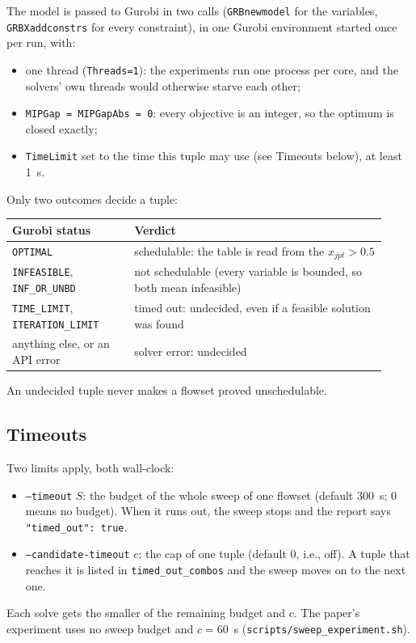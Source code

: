 \documentclass[11pt]{article}
\begin{document}
The model is passed to Gurobi in two calls (\texttt{GRBnewmodel} for the
variables, \texttt{GRBXaddconstrs} for every constraint), in one Gurobi
environment started once per run, with:
\begin{itemize}
    \item one thread (\texttt{Threads=1}): the experiments run one process per
          core, and the solvers' own threads would otherwise starve each
          other;
    \item \texttt{MIPGap = MIPGapAbs = 0}: every objective is an integer, so
          the optimum is closed exactly;
    \item \texttt{TimeLimit} set to the time this tuple may use (see
          Timeouts below), at least 1~s.
\end{itemize}
Only two outcomes decide a tuple:
\begin{center}
\begin{tabular}{p{0.3\linewidth}p{0.62\linewidth}}
\toprule
\textbf{Gurobi status} & \textbf{Verdict} \\
\midrule
\texttt{OPTIMAL} & schedulable: the table is read from the $x_{jpt} > 0.5$ \\
\texttt{INFEASIBLE}, \texttt{INF\_OR\_UNBD} & not schedulable (every variable is bounded, so both mean infeasible) \\
\texttt{TIME\_LIMIT}, \texttt{ITERATION\_LIMIT} & timed out: undecided, even if a feasible solution was found \\
anything else, or an API error & solver error: undecided \\
\bottomrule
\end{tabular}
\end{center}
An undecided tuple never makes a flowset proved unschedulable.

\subsection*{Timeouts}

Two limits apply, both wall-clock:
\begin{itemize}
    \item \texttt{--timeout} $S$: the budget of the whole sweep of one flowset
          (default 300~s; 0 means no budget). When it runs out, the sweep
          stops and the report says \texttt{"timed\_out": true}.
    \item \texttt{--candidate-timeout} $c$: the cap of one tuple (default 0,
          i.e., off). A tuple that reaches it is listed in
          \texttt{timed\_out\_combos} and the sweep moves on to the next one.
\end{itemize}
Each solve gets the smaller of the remaining budget and $c$. The paper's
experiment uses no sweep budget and $c = 60$~s
(\texttt{scripts/sweep\_experiment.sh}).
\end{document}
